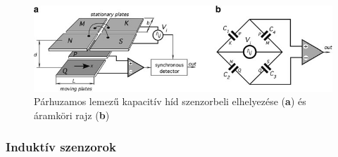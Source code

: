 \begin{figure}
	\centering
	\includegraphics{figures/kapacitiv_hid.png}
	\caption{Párhuzamos lemezű kapacitív híd szenzorbeli elhelyezése (\textbf{a}) és áramköri rajz (\textbf{b})}
	\label{kapacitiv_hid}
\end{figure}

\subsubsection{Induktív szenzorok}


